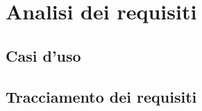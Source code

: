 \chapter{Analisi dei requisiti}
\label{cap:analisi-requisiti}


\section{Casi d'uso}

%
%

\section{Tracciamento dei requisiti}

